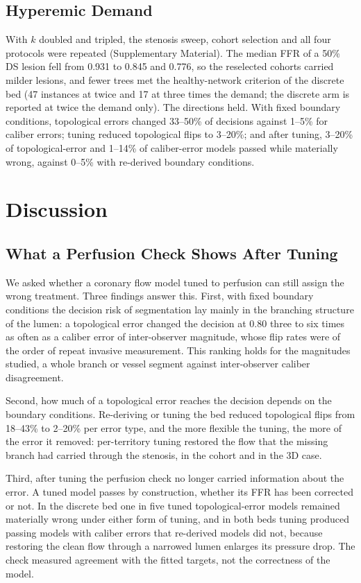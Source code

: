 \documentclass[journal]{IEEEtran}
\begin{document}
\subsection{Hyperemic Demand}\label{sec:demand}
With $k$ doubled and tripled, the stenosis sweep, cohort selection and all four protocols were repeated
(Supplementary Material). The median FFR of a 50\% DS lesion fell from 0.931 to 0.845 and 0.776, so the reselected
cohorts carried milder lesions, and fewer trees met the healthy-network criterion of the discrete bed (47 instances at
twice and 17 at three times the demand; the discrete arm is reported at twice the demand only). The directions held.
With fixed boundary conditions, topological errors changed 33--50\% of decisions against 1--5\% for caliber errors;
tuning reduced topological flips to 3--20\%; and after tuning, 3--20\% of topological-error and 1--14\% of
caliber-error models passed while materially wrong, against 0--5\% with re-derived boundary conditions.

\section{Discussion}
\subsection{What a Perfusion Check Shows After Tuning}
We asked whether a coronary flow model tuned to perfusion can still assign the wrong treatment. Three findings
answer this. First, with fixed boundary conditions the decision risk of segmentation lay mainly in the branching
structure of the lumen: a topological error changed the decision at 0.80 three to six times as often as a caliber
error of inter-observer magnitude, whose flip rates were of the order of repeat invasive measurement. This ranking
holds for the magnitudes studied, a whole branch or vessel segment against inter-observer caliber disagreement.

Second, how much of a topological error reaches the decision depends on the boundary conditions. Re-deriving or
tuning the bed reduced topological flips from 18--43\% to 2--20\% per error type, and the more flexible the tuning, the more of the
error it removed: per-territory tuning restored the flow that the missing branch had carried through the stenosis,
in the cohort and in the 3D case.

Third, after tuning the perfusion check no longer carried information about the error. A tuned model passes by
construction, whether its FFR has been corrected or not. In the discrete bed one in five tuned topological-error
models remained materially wrong under either form of tuning, and in both beds tuning produced passing models with
caliber errors that re-derived models did not, because restoring the clean flow through a narrowed lumen enlarges
its pressure drop. The check measured agreement with the fitted targets, not the correctness of the model.
\end{document}
